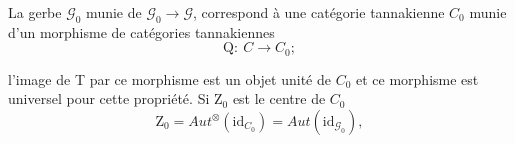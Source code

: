 La gerbe $\mathcal{G}_{0}$ munie de $\mathcal{G}_{0} \to \mathcal{G}$, correspond à une catégorie tannakienne $C_{0}$
munie d'un morphisme de catégories tannakiennes
\[ \mathrm{Q} : \ C \to C_{0}; \]

l'image de T par ce morphisme est un objet unité de $C_{0}$ et ce morphisme
est universel pour cette propriété. Si $\mathrm{Z}_{0}$ est le centre de $C_{0}$
\[ \mathrm{Z}_{0} = \mathit{Aut}^{\otimes}(\mathrm{id}_{C_{0}}) = \mathit{Aut}(\mathrm{id}_{\mathcal{G}_{0}}), \]

